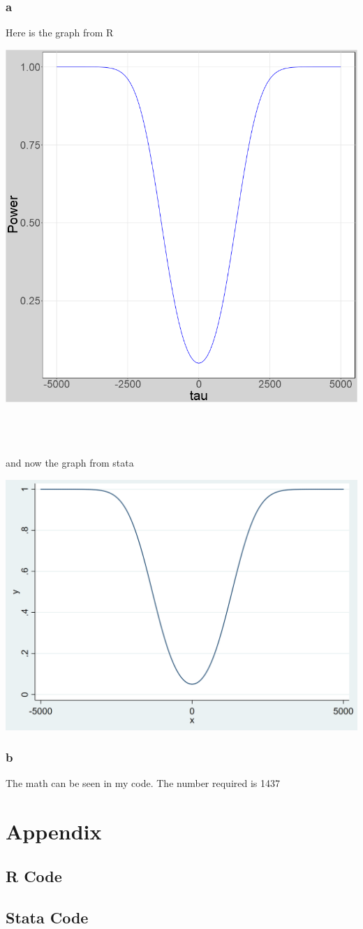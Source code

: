 \documentclass[11pt]{article}
\begin{document}
 \subsubsection{a}
 Here is the graph from R 
\begin{minipage}{\linewidth}
	\begin{center}
		\includegraphics[width=.6\linewidth]{power_func_r.png}
	\end{center}
\end{minipage}
\\
\\
\\
and now the graph from stata 
\begin{minipage}{\linewidth}
	\begin{center}
		\includegraphics[width=.6\linewidth]{stata_power_func.png}
	\end{center}
\end{minipage}


 \subsubsection{b}
 The math can be seen in my code. The number required is 1437
 
 \section{Appendix}
 \subsection{R Code}
 
 
 \subsection{Stata Code}
  
 
 
 
\end{document}
